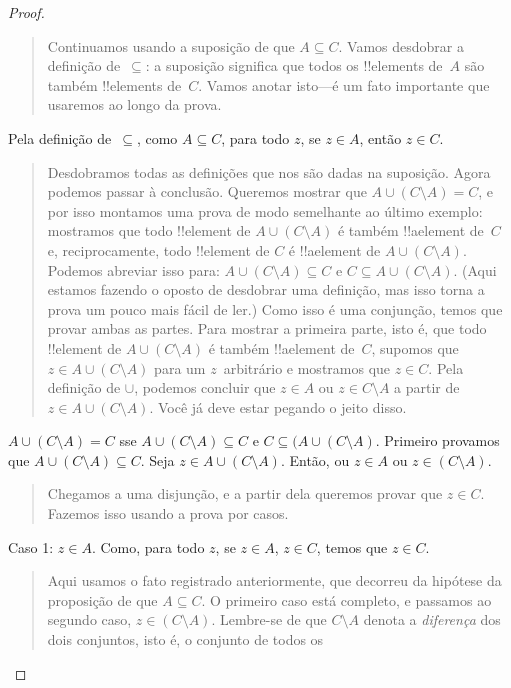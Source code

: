 \documentclass[../../../include/open-logic-section]{subfiles}
\begin{document}
\begin{proof}
\begin{quote}
    Continuamos usando a suposição de que $A \subseteq C$. Vamos
    desdobrar a definição de~$\subseteq$: a suposição significa que
    todos os !!{element}s de~$A$ são também !!{element}s de~$C$. Vamos anotar
    isto---é um fato importante que usaremos ao longo da
    prova.
  \end{quote}
  Pela definição de~$\subseteq$, como $A \subseteq C$, para todo
  $z$, se $z \in A$, então $z \in C$.
  \begin{quote}
    Desdobramos todas as definições que nos são dadas na
    suposição. Agora podemos passar à conclusão. Queremos mostrar
    que $A \cup (C \setminus A) = C$, e por isso montamos uma prova
    de modo semelhante ao último exemplo: mostramos que todo !!{element} de
    $A \cup (C \setminus A)$ é também !!a{element} de~$C$ e,
    reciprocamente, todo !!{element} de $C$ é !!a{element} de $A \cup (C
    \setminus A)$. Podemos abreviar isso para: $A \cup (C \setminus A)
    \subseteq C$ e $C \subseteq A \cup (C \setminus A)$. (Aqui estamos
    fazendo o oposto de desdobrar uma definição, mas isso torna a
    prova um pouco mais fácil de ler.)  Como isso é uma conjunção, temos
    que provar ambas as partes. Para mostrar a primeira parte, isto é, que todo
    !!{element} de $A \cup (C \setminus A)$ é também !!a{element}
    de~$C$, supomos que $z \in A \cup (C \setminus A)$ para um
    $z$~arbitrário e mostramos que $z \in C$. Pela definição de
    $\cup$, podemos concluir que $z \in A$ ou $z \in C \setminus A$
    a partir de $z \in A \cup (C \setminus A)$. Você já deve estar pegando o
    jeito disso.
    \end{quote}
  $A \cup (C \setminus A) = C$ sse $A \cup (C \setminus A) \subseteq
  C$ e $C \subseteq (A \cup (C \setminus A)$.  Primeiro provamos que
  $A \cup (C \setminus A) \subseteq C$.  Seja $z \in A \cup (C
  \setminus A)$. Então, ou $z \in A$ ou $z \in (C \setminus A)$.
  \begin{quote}
    Chegamos a uma disjunção, e a partir dela queremos provar que
    $z \in C$. Fazemos isso usando a prova por casos.
  \end{quote}
  Caso 1: $z \in A$. Como, para todo $z$, se $z \in A$, $z \in C$,
  temos que $z \in C$.
  \begin{quote}
    Aqui usamos o fato registrado anteriormente, que decorreu da
    hipótese da proposição de que $A \subseteq C$.  O primeiro
    caso está completo, e passamos ao segundo caso, $z \in (C
    \setminus A)$.  Lembre-se de que $C \setminus A$ denota a
    \emph{diferença} dos dois conjuntos, isto é, o conjunto de todos os

\end{quote}
\end{proof}
\end{document}
